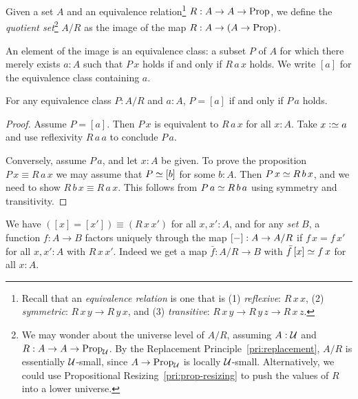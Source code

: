 \begin{definition}\label{def:quotient-set}
Given a set $A$ and an equivalence relation\footnote{%
  Recall that an \emph{equivalence relation} is one that is
  (1) \emph{reflexive}: $R\,x\,x$,
  (2) \emph{symmetric}: $R\,x\,y \to R\,y\,x$, and
  (3) \emph{transitive}: $R\,x\,y \to R\,y\,z \to R\,x\,z$.}
$R : A \to A \to \mathrm{Prop}$,
we define the \emph{quotient set}\footnote{%
  We may wonder about the universe level of $A/R$,
  assuming $A : {\mathcal{U}}$ and $R : A \to A \to \mathrm{Prop}_{\mathcal{U}}$.
  By the Replacement Principle~\cref{pri:replacement},
  $A/R$ is essentially ${\mathcal{U}}$-small, since $A\to\mathrm{Prop}_{\mathcal{U}}$
  is locally ${\mathcal{U}}$-small. Alternatively, we could use
  Propositional Resizing~\cref{pri:prop-resizing} to push
  the values of $R$ into a lower universe.}
$A/R$ as the image of the map $R : A \to (A \to \mathrm{Prop})$.
\end{definition}
An element of the image is an equivalence class:
a subset $P$ of $A$ for which there merely exists $a:A$
such that $P\,x$ holds if and only if $R\,a\,x$ holds.
We write $[a]$ for the equivalence class containing $a$.
\begin{lemma}\label{lem:equiv-class-prop}
  For any equivalence class $P : A/R$ and $a:A$,
  $P = [a]$ if and only if $P\,a$ holds.
\end{lemma}
\begin{proof}
  Assume $P = [a]$. Then $P\,x$ is equivalent to $R\,a\,x$ for all $x:A$.
  Take $x\defeq a$ and use reflexivity $R\,a\,a$ to conclude $P\,a$.

  Conversely, assume $P\,a$, and let $x:A$ be given.
  To prove the proposition $P\,x \equiv R\,a\,x$ we may assume that
  $P \jdeq [b]$ for some $b:A$.
  Then $P\,x \jdeq R\,b\,x$, and we need to show $R\,b\,x \equiv R\,a\,x$.
  This follows from $P\,a \jdeq R\,b\,a$ using symmetry and transitivity.
\end{proof}
\begin{theorem}\label{thm:quotient-property}
  We have $([x] = [x']) \equiv (R\,x\,x')$ for all $x,x':A$,
  and for any \emph{set} $B$, a
  function $f : A \to B$ factors uniquely through the map $[{-}] : A \to A/R$ if
  $f\,x=f\,x'$ for all $x,x':A$ with $R\,x\,x'$.
  Indeed we get a map $\bar f : A/R \to B$ with
  $\bar f\,[x] \jdeq f\,x$ for all $x:A$.
\end{theorem}
